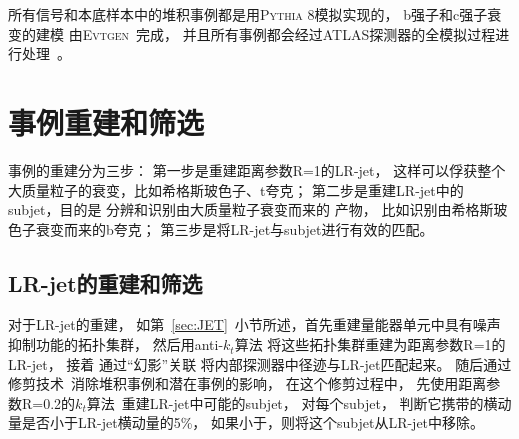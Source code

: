所有信号和本底样本中的堆积事例都是用\textsc{Pythia 8}模拟实现的，
b强子和c强子衰变的建模
由\textsc{Evtgen}~\cite{Lange:2001uf}完成，
并且所有事例都会经过ATLAS探测器的全模拟过程进行处理~\cite{SOFT-2010-01,ATHENA}。



\section{事例重建和筛选}
\label{sec:XbbOR}

事例的重建分为三步：
第一步是重建距离参数R=1的LR-jet，
这样可以俘获整个大质量粒子的衰变，比如希格斯玻色子、t夸克；
第二步是重建LR-jet中的subjet，目的是
分辨和识别由大质量粒子衰变而来的
产物，
比如识别由希格斯玻色子衰变而来的b夸克；
第三步是将LR-jet与subjet进行有效的匹配。

\subsection{LR-jet的重建和筛选}
\label{sec:XbbORLR}

对于LR-jet的重建，
如第~\ref{sec:JET}~小节所述，首先重建量能器单元中具有噪声抑制功能的拓扑集群，
然后用anti-$k_t$算法
将这些拓扑集群重建为距离参数R=1的LR-jet，
接着
通过“幻影”关联
将内部探测器中径迹与LR-jet匹配起来。
随后通过修剪技术~\cite{Krohn:2009th}消除堆积事例和潜在事例的影响，
在这个修剪过程中，
先使用距离参数R=0.2的$k_t$算法~\cite{KTA}重建LR-jet中可能的subjet，
对每个subjet，
判断它携带的横动量是否小于LR-jet横动量的5\%，
如果小于，则将这个subjet从LR-jet中移除。

